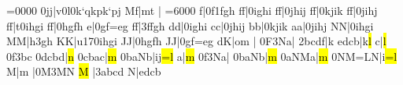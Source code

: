 \cleftoksi={{0}{0}{0}{0}}\changeclefs
\barre\notes\dsoqb0jj|\octline v\ibl0l0\soqb k\lq q\soqb k\zq p\soqb k\lq p\soqb j\enotes
\temps\notes{}\zq M\cu f|\zq m\cl t\enotes
\znotes|\zbreath\enotes
\cleftoksi={{6}{0}{0}{0}}\changeclefs
\temps\notes\dsoupir\boql f|\ibl0f1\soqb f\soqb g\soqb h\enotes
\barre\notes{}\boql f\sk\boql f|\qsoqb0ighi\enotes
\temps\notes\boql f\sk\boql f|\qsoqb0jhij\enotes
\barre\notes\boql f\sk\boql f|\qsoqb0kjik\enotes
\temps\notes\boql f\sk\boql f|\qsoqb0jihj\enotes
\relax
\barre\notes\boql f\sk\boql f|\octline t\qsoqb0ihgi\enotes
\temps\notes\boql f\sk\boql f|\qsoqb0hgfh\enotes
\barre\notes{}\sk\boql e|\qsoqb0gf{=e}g\enotes
\temps\notes\boql f\sk\boql f|\qsoqb3ffgh\enotes
\barre\notes\boql d\sk\boql d|\qsoqb0ighi\enotes
\temps\notes\boql c\sk\boql c|\qsoqb0jhij\enotes
\barre\notes\boql b\sk\boql b|\qsoqb0kjik\enotes
\temps\notes\boql a\sk\boql a|\qsoqb0jihj\enotes
\barre\notes\boql N\sk\boql N|\qsoqb0ihgi\enotes
\temps\notes\boql M\sk\boql M|\soql h\sk\dsoqb3gh\enotes
\barre\notes\boql K\sk\boql K|\octfin u{17}\qsoqb0ihgi\enotes
\temps\notes\boql J\sk\boql J|\qsoqb0hgfh\enotes
\barre\notes\boql J\sk\boql J|\qsoqb0gf{=e}g\enotes
\temps\NOtes\pointdorgue d\bohu K|\pointdorgue o\bohl m\cbreath\enotes
\barre\notes{}\soupir|\enotes
\temps\notes\Ilegl0F\dqb3Na|\hpause\enotes
\temps\notes\qqb2bcdf|\hu k\enotes
\barre\notes{}edcb|\lh k\hl l\enotes
\temps\notes{}\ql c\sk|\hl l\enotes
\temps\notes\Ilegu0f\dqb3bc\enotes
\barre\notes\qqB0dcbd|\hl n\enotes
\temps\notes\qqB0cbac|\hl m\enotes
\barre\notes\qqB0baNb|\lh i\zh j\hl{=l}\enotes
\temps\notes{}\ql a\sk|\hl m\enotes
\temps\notes\Ilegu0f\dqb3Na|\enotes
\barre\notes\qqB0baNb|\hl m\enotes
\temps\notes\qqB0aNMa|\hl m\enotes
\barre\notes\qqB0NM{=L}N|\lh i\hl{=l}\enotes
\temps\notes{}\ql M\sk|\ql m\enotes
\temps\notes\soupir|\Ilegl0M\dqh3MN\enotes
\barre\notes{}\hl M\relax
   |\qqh3abcd\enotes
\temps\notes{}\zh N|edcb\enotes
